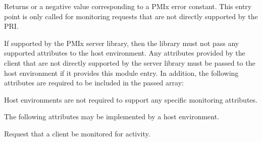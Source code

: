 \begin{arglist}
\end{arglist}

Returns  or a negative value corresponding to a PMIx error constant. This entry point is only called for monitoring requests that are not directly supported by the \ac{PRI}.

\reqattrstart
If supported by the \ac{PMIx} server library, then the library must not pass any supported attributes to the host environment. Any attributes provided by the client that are not directly supported by the server library must be passed to the host environment if it provides this module entry. In addition, the following attributes are required to be included in the passed  array:


Host environments are not required to support any specific monitoring attributes.

\reqattrend

\optattrstart
The following attributes may be implemented by a host environment.


\optattrend

\descr

Request that a client be monitored for activity.

